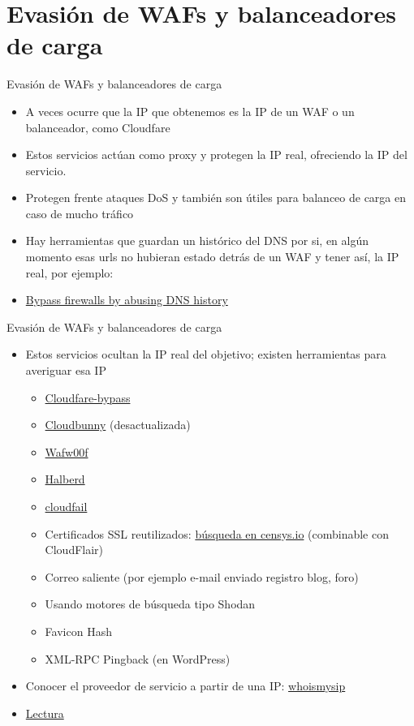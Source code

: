 \documentclass[aspectratio=169,11pt]{beamer}
\begin{document}
\section{Evasión de WAFs y balanceadores de carga}

\begin{frame}[allowframebreaks]{Evasión de WAFs y balanceadores de carga}
\small
  \begin{itemize}
  \item A veces ocurre que la IP que obtenemos es la IP de un WAF o un balanceador, como Cloudfare
  \item Estos servicios actúan como proxy y protegen la IP real, ofreciendo la IP del servicio.
  \item Protegen frente ataques DoS y también son útiles para balanceo de carga en caso de mucho tráfico
  \item Hay herramientas que guardan un histórico del DNS por si, en algún momento esas urls no hubieran estado detrás de un WAF y tener así, la IP real, por ejemplo:
  \item \href{https://github.com/Elsfa7-110/bypass-firewalls-by-DNS-history}{Bypass firewalls by abusing DNS history}
  \end{itemize}
\end{frame}

\begin{frame}[allowframebreaks]{Evasión de WAFs y balanceadores de carga}
\small
  \begin{itemize}
  \item Estos servicios ocultan la IP real del objetivo; existen herramientas para averiguar esa IP
    \begin{itemize}
    \item \href{https://github.com/jychp/cloudflare-bypass}{Cloudfare-bypass}
    \item \href{https://github.com/Warflop/CloudBunny}{Cloudbunny} (desactualizada)
    \item \href{https://github.com/EnableSecurity/wafw00f}{Wafw00f}
    \item \href{https://github.com/jmbr/halberd}{Halberd}
    \item \href{https://github.com/m0rtem/CloudFail}{cloudfail}
    \item Certificados SSL reutilizados: \href{https://censys.io/certificates?q=parsed.names\%3A+elhacker.net}{búsqueda en censys.io} (combinable con CloudFlair)
    \item Correo saliente (por ejemplo e-mail enviado registro blog, foro)
    \item Usando motores de búsqueda tipo Shodan
    \item Favicon Hash
    \item XML-RPC Pingback (en WordPress)
    \end{itemize}
  \item Conocer el proveedor de servicio a partir de una IP: \href{https://www.whoismyisp.org/}{whoismysip}
  \item \href{https://jychp.medium.com/how-to-bypass-cloudflare-bot-protection-1f2c6c0c36fb}{Lectura}
  \end{itemize}
\end{frame}
\end{document}

